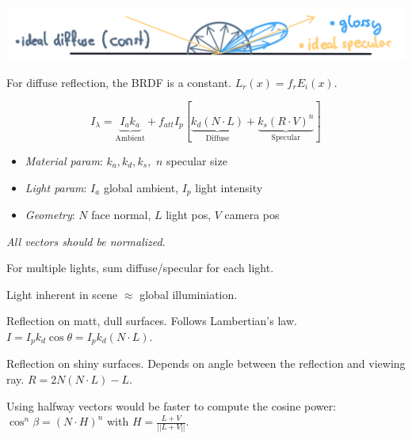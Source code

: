 \includegraphics*[width=\linewidth]{assets/reflections.png}

\begin{definition}
  For diffuse reflection, the BRDF is a constant.
  \(L_r(x) = f_r E_i(x)\).
\end{definition}

\begin{algorithm}
  \[I_\lambda = \underbrace{I_a k_a}_{\text{Ambient}} + f_{att}I_p[\underbrace{k_d(N \cdot L)}_{\text{Diffuse}} + \underbrace{k_s(R \cdot V)^n}_{\text{Specular}}]\]
  \begin{itemize}
    \item \textit{Material param}: \(k_a, k_d, k_s,\) \(n\) specular size
    \item \textit{Light param}: \(I_a\) global ambient, \(I_p\) light intensity
    \item \textit{Geometry}: \(N\) face normal, \(L\) light pos, \(V\) camera pos
  \end{itemize}
  \textit{All vectors should be normalized}.
\end{algorithm}

\begin{theorem}
  For multiple lights, sum diffuse/specular for each light.
\end{theorem}

\begin{definition}[Ambient]
  Light inherent in scene \(\approx\) global illuminiation.
\end{definition}

\begin{definition}[Diffuse]
  Reflection on matt, dull surfaces. Follows Lambertian's law.
  \(I = I_pk_d\cos \theta = I_p k_d(N \cdot L)\).
\end{definition}

\begin{definition}[Specular]
  Reflection on shiny surfaces. Depends on angle between the reflection and viewing ray. \(R=2N(N \cdot L) - L\).
\end{definition}

\begin{theorem}
  Using halfway vectors would be faster to compute the cosine power: \(\cos^n \beta = (N \cdot H)^n\) with \(H = \frac{L + V}{||L + V||}\).
\end{theorem}


